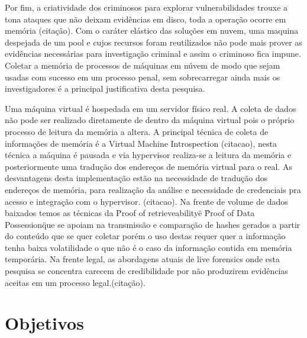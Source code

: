 \documentclass[
	12pt,				%
	openright,			%
	oneside,			%
	a4paper,			%
	english,			%
	french,				%
	spanish,			%
	brazil,				%
	]{abntex2}
\begin{document}
\par

Por fim, a criatividade dos criminosos para explorar vulnerabilidades trouxe a tona ataques que não deixam evidências em disco, toda a operação ocorre em memória (citação). Com o caráter 
elástico das soluções em nuvem, uma maquina despejada de um pool e cujos recursos foram reutilizados não pode mais prover as evidências necessárias para investigação criminal e 
assim o criminoso fica impune. Coletar a memória de processos de máquinas em núvem de modo que sejam usadas com sucesso em um processo penal, sem sobrecarregar ainda mais os investigadores 
é a principal justificativa desta pesquisa.

\par

Uma máquina virtual é hospedada em um servidor físico real. A coleta de dados não pode ser realizado diretamente de dentro da máquina virtual pois o próprio processo de leitura da
memória a altera. A principal técnica de coleta de informações de memória é a Virtual Machine Introspection (citacao), nesta técnica a máquina é pausada e via hypervisor realiza-se a leitura
da memória e posteriormente uma tradução dos endereços de memória virtual para o real. As desvantagens desta implementação estão na necessidade de tradução dos endereços de memória,
para realização da análise e necessidade de credenciais pra acesso e integração com o hypervisor. (citacao). Na frente de volume de dados baixados temos as técnicas da \"Proof of
retrieveability\" e \"Proof of Data Possession\" que se apoiam na transmissão e comparação de hashes gerados a partir do conteúdo que se quer coletar porém o uso destas requer
quer a informação tenha baixa volatilidade o que não é o caso da informação contida em memória temporária. Na frente legal, as abordagens atuais de live forensics onde esta pesquisa
se concentra carecem de credibilidade por não produzirem evidências aceitas em um processo legal.(citação).

\chapter{Objetivos}
\end{document}
